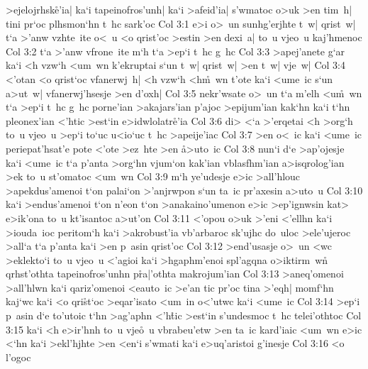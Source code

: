 >ejelojrhsk\r{e}'ia|
ka`i
tapeinofros'unh|
ka`i
>afeid'ia|
s'wmatoc
o>uk
>en
tim~h|
tini
pr`oc
plhsmon`hn
t~hc
sark'oc\bibvsend
\vs Col 3:1
e>i
o>~un
sunhg'erjhte
t~w|
qrist~w|
t`a
>'anw
vzhte~ite
o<~u
<o
qrist'oc
>estin
>en
dexi~a|
to~u
vjeo~u
kaj'hmenoc\bibvsend
\vs Col 3:2
t`a
>'anw
vfrone~ite
m`h
t`a
>ep`i
t~hc
g~hc\bibvsend
\vs Col 3:3
>apej'anete
g`ar
ka`i
<h
vzw`h
<um~wn
k'ekruptai
s`un
t~w|
qrist~w|
>en
t~w|
vje~w|\bibvsend
\vs Col 3:4
<'otan
<o
qrist`oc
vfanerwj~h|
<h
vzw`h
<h\r{m}~wn
t'ote
ka`i
<ume~ic
s`un
a>ut~w|
vfanerwj'hsesje
>en
d'oxh|\bibvsend
\vs Col 3:5
nekr'wsate
o>~un
t`a
m'elh
<u\r{m}~wn
t`a
>ep`i
t~hc
g~hc
porne'ian
>akajars'ian
p'ajoc
>epijum'ian
kak`hn
ka`i
t`hn
pleonex'ian
<'htic
>est`in
e>idwlolatr\r{e}'ia\bibvsend
{}
\vs Col 3:6
di>
<`a
>'erqetai
<h
>org`h
to~u
vjeo~u
>ep`i
to`uc
u<io`uc
t~hc
>apeije'iac\bibvsend
\vs Col 3:7
>en
o<~ic
ka`i
<ume~ic
periepat'hsat'e
pote
<'ote
>ez~hte
>en
\r{a}>uto~ic\bibvsend
{}
\vs Col 3:8
nun`i
d`e
>ap'ojesje
ka`i
<ume~ic
t`a
p'anta
>org`hn
vjum`on
kak'ian
vblasfhm'ian
a>isqrolog'ian
>ek
to~u
st'omatoc
<um~wn\bibvsend
\vs Col 3:9
m`h
ye'udesje
e>ic
>all'hlouc
>apekdus'amenoi
t`on
palai`on
>'anjrwpon
s`un
ta~ic
pr'axesin
a>uto~u\bibvsend
\vs Col 3:10
ka`i
>endus'amenoi
t`on
n'eon
t`on
>anakaino'umenon
e>ic
>ep'ignwsin
kat>
e>ik'ona
to~u
kt'isantoc
a>ut'on\bibvsend
\vs Col 3:11
<'opou
o>uk
>'eni
<'ellhn
ka`i
>iouda~ioc
peritom`h
ka`i
>akrobust'ia
vb'arbaroc
sk'ujhc
do~uloc
>ele'ujeroc
>all`a
t`a
p'anta
ka`i
>en
p~asin
qrist'oc\bibvsend
\vs Col 3:12
>end'usasje
o>~un
<wc
>eklekto`i
to~u
vjeo~u
<'agioi
ka`i
>hgaphm'enoi
spl'agqna
o>iktirm~w\r{n}
qrhst'othta
tapeinofros'unhn
p\r{r}a|'othta
makrojum'ian\bibvsend
\vs Col 3:13
>aneq'omenoi
>all'hlwn
ka`i
qariz'omenoi
<eauto~ic
>e'an
tic
pr'oc
tina
>'eqh|
momf`hn
kaj`wc
ka`i
<o
qri\r{s}t`oc
>eqar'isato
<um~in
o<'utwc
ka`i
<ume~ic\bibvsend
\vs Col 3:14
>ep`i
p~asin
d`e
to'utoic
t`hn
>ag'aphn
<'h\r{t}ic
>est`in
s'undesmoc
t~hc
telei'othtoc\bibvsend
\vs Col 3:15
ka`i
<h
e>ir'hnh
to~u
vje\r{o}~u
vbrabeu'etw
>en
ta~ic
kard'iaic
<um~wn
e>ic
<`hn
ka`i
>ekl'hjhte
>en
<en`i
s'wmati
ka`i
e>uq'aristoi
g'inesje\bibvsend
\vs Col 3:16
<o
l'ogoc
